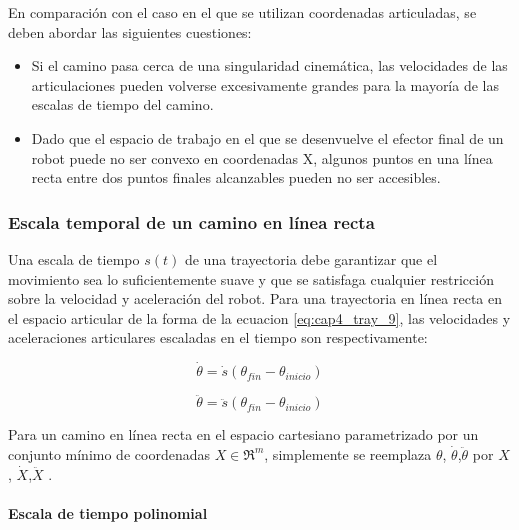         En comparación con el caso en el que se utilizan coordenadas articuladas, se deben abordar las siguientes cuestiones:
        \begin{itemize}
                \item Si el camino pasa cerca de una singularidad cinemática, las velocidades de las articulaciones pueden volverse excesivamente grandes para la mayoría de las escalas de tiempo del camino.
                \item Dado que el espacio de trabajo en el que se desenvuelve el efector final de un robot puede no ser convexo en coordenadas X, algunos puntos en una línea recta entre dos puntos finales alcanzables pueden no ser accesibles. 
        \end{itemize}

        \newpage

            
            
            
        \subsubsection{Escala temporal de un camino en línea recta}
            Una escala de tiempo $s(t)$ de una trayectoria debe garantizar que el movimiento sea lo suficientemente suave y que se satisfaga cualquier restricción sobre la velocidad y aceleración del robot. Para una trayectoria en línea recta en el espacio articular de la forma de la ecuacion \ref{eq:cap4_tray_9}, las velocidades y aceleraciones articulares escaladas en el tiempo son respectivamente:
        
        
            \begin{equation}
                \dot{\theta}=\dot{s} (\theta_{fin}-\theta_{inicio})
                \label{eq:cap4_tray_13}
             \end{equation}      
             
            \begin{equation}
                \ddot{\theta}=\ddot{s} (\theta_{fin}-\theta_{inicio})
                \label{eq:cap4_tray_14}
             \end{equation}  
        
    Para un camino en línea recta en el espacio cartesiano parametrizado por un conjunto mínimo de coordenadas $X\in{\Re}^m$, simplemente se reemplaza $\theta$, $\dot{\theta}$,$\ddot{\theta}$ por $X$, $\dot{X}$,$\ddot{X}$ .        
        
        \paragraph{Escala de tiempo polinomial}
        
